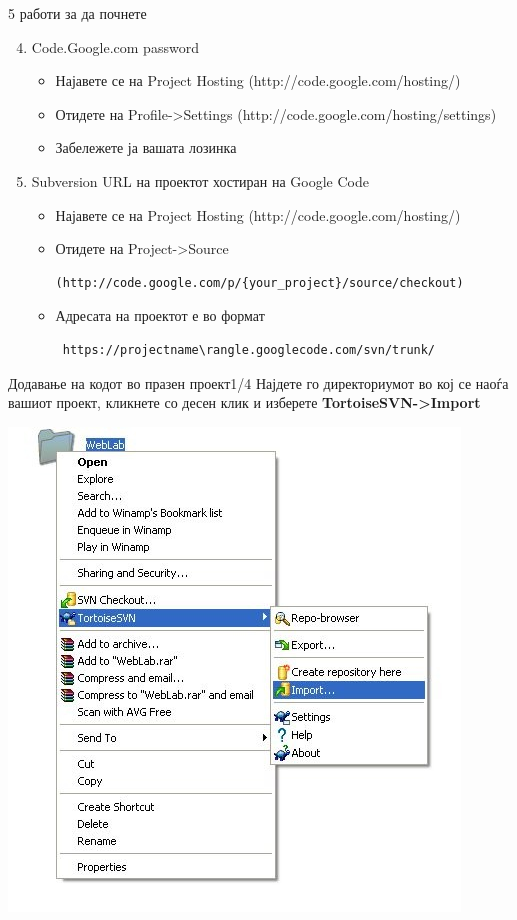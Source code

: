 \begin{frame}[fragile]{5 работи за да почнете}
\begin{enumerate}\setcounter{enumi}{3}
  \item Code.Google.com password
  \begin{itemize}
  \item Најавете се на Project Hosting (http://code.google.com/hosting/)
  \item Отидете на Profile->Settings (http://code.google.com/hosting/settings)
  \item Забележете ја вашата лозинка
  \end{itemize}
  \item Subversion URL на проектот хостиран на Google Code
  \begin{itemize}
  \item Најавете се на Project Hosting (http://code.google.com/hosting/)
  \item Отидете на Project->Source 
  \begin{verbatim}(http://code.google.com/p/{your_project}/source/checkout)\end{verbatim}
  \item Адресата на проектот е во формат \begin{verbatim} https://projectname\rangle.googlecode.com/svn/trunk/ \end{verbatim}
  \end{itemize}
\end{enumerate}
\end{frame}

\begin{frame}{Додавање на кодот во празен проект}{1/4}
Најдете го директориумот во кој се наоѓа вашиот проект, кликнете со десен клик и
изберете \textbf{TortoiseSVN->Import}
\begin{center}
    \includegraphics[scale=0.4]{images/svn_import.png}
\end{center}
\end{frame}

